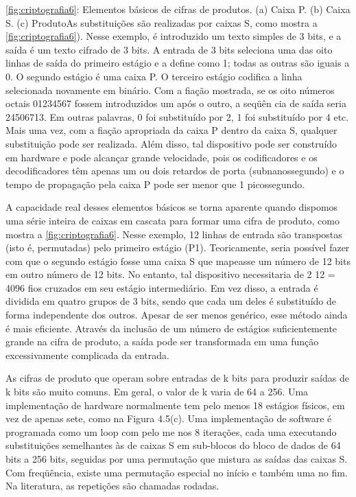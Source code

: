 \ref{fig:criptografia6}: Elementos básicos de cifras de produtos. (a) Caixa P. (b) Caixa S. (c) ProdutoAs substituições são realizadas por caixas S, como mostra a \ref{fig:criptografia6}). Nesse exemplo, é
introduzido um texto simples de 3 bits, e a saída é um texto cifrado de 3 bits. A entrada de 3 bits
seleciona uma das oito linhas de saída do primeiro estágio e a define como 1; todas as outras são
iguais a 0. O segundo estágio é uma caixa P. O terceiro estágio codifica a linha selecionada
novamente em binário. Com a fiação mostrada, se os oito números octais 01234567 fossem
introduzidos um após o outro, a seqüên cia de saída seria 24506713. Em outras palavras, 0 foi
substituído por 2, 1 foi substituído por 4 etc. Mais uma vez, com a fiação apropriada da caixa P
dentro da caixa S, qualquer substituição pode ser realizada. Além disso, tal dispositivo pode ser
construído em hardware e pode alcançar grande velocidade, pois os codificadores e os
decodificadores têm apenas um ou dois retardos de porta (subnanossegundo) e o tempo de
propagação pela caixa P pode ser menor que 1 picossegundo.

A capacidade real desses elementos básicos se torna aparente quando dispomos uma série inteira
de caixas em cascata para formar uma cifra de produto, como mostra a 
\ref{fig:criptografia6}. Nesse
exemplo, 12 linhas de entrada são transpostas (isto é, permutadas) pelo primeiro estágio (P1).
Teoricamente, seria possível fazer com que o segundo estágio fosse uma caixa S que mapeasse um
número de 12 bits em outro número de 12 bits. No entanto, tal dispositivo necessitaria de 2 12 =
4096 fios cruzados em seu estágio intermediário. Em vez disso, a entrada é dividida em quatro
grupos de 3 bits, sendo que cada um deles é substituído de forma independente dos outros. Apesar
de ser menos genérico, esse método ainda é mais eficiente. Através da inclusão de um número de
estágios suficientemente grande na cifra de produto, a saída pode ser transformada em uma
função excessivamente complicada da entrada.

As cifras de produto que operam sobre entradas de k bits para produzir saídas de k bits são muito
comuns. Em geral, o valor de k varia de 64 a 256. Uma implementação de hardware normalmente
tem pelo menos 18 estágios físicos, em vez de apenas sete, como na Figura 4.5(c). Uma
implementação de software é programada como um loop com pelo me nos 8 iterações, cada uma
executando substituições semelhantes às de caixas S em sub-blocos do bloco de dados de 64 bits a
256 bits, seguidas por uma permutação que mistura as saídas das caixas S. Com freqüência, existe
uma permutação especial no início e também uma no fim. Na literatura, as repetições são
chamadas rodadas.

